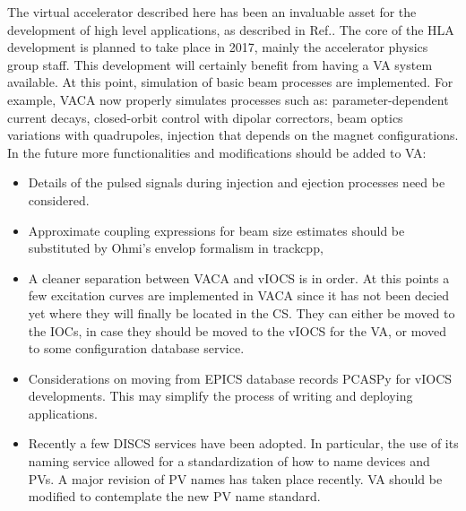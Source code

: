 \documentclass[a4paper,
              ]{jacow}
\begin{document}
The virtual accelerator described here has been an invaluable asset for the development of high level applications, as described in Ref.\cite{sirius_hla}.
The core of the HLA development is planned to take place in 2017, mainly the accelerator physics group staff. This development will certainly benefit from having a VA system available.
At this point, simulation of basic beam processes are implemented.
For example, VACA now properly simulates processes such as: parameter-dependent current decays, closed-orbit control with dipolar correctors, beam optics variations with quadrupoles,
injection that depends on the magnet configurations.
In the future more functionalities and modifications should be added to VA:
\begin{itemize}
\item Details of the pulsed signals during injection and ejection processes need be considered.
\item Approximate coupling expressions for beam size estimates should be substituted by Ohmi's envelop formalism\cite{ohmi} in trackcpp,
\item A cleaner separation between VACA and vIOCS is in order. At this points a few excitation curves are implemented in VACA since it has not been decied yet where they will finally be located in the CS. They can either be moved to the IOCs, in case they should be moved to the vIOCS for the VA, or moved to some configuration database service.
\item Considerations on moving from EPICS database records PCASPy for vIOCS developments. This may simplify the process of writing and deploying applications.
\item Recently a few DISCS\cite{discs} services have been adopted. In particular, the use of its naming service allowed for a standardization of how to name devices and PVs. A major revision of PV names has taken place recently. VA should be modified to contemplate the new PV name standard.
\end{itemize}
\end{document}
